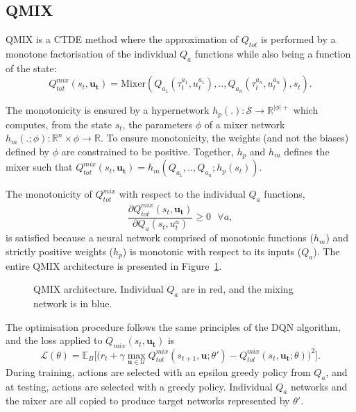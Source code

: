 \subsection{QMIX}
QMIX \citep{Rashid2018} is a CTDE method where the approximation of $Q_{tot}$ is performed by a monotone factorisation of the individual $Q_a$ functions while also being a function of the state:
\begin{equation}
     Q_{tot}^{mix}(s_t, \mathbf{u_t})=\text{Mixer} \left(Q_{a_1}(\tau^{a_1}_t, u_t^{a_1}) ,..,Q_{a_n}(\tau^{a_n}_t, u_t^{a_n}), s_t\right).
     \label{eq:ch3_qmixappendix}
\end{equation}

The monotonicity is ensured by a hypernetwork \citep{Ha2016HyperNetworks} $h_p(.): \mathcal{S} \rightarrow \mathbb{R}^{|\phi|+}$ which computes, from the state $s_t$, the parameters $\phi$ of a mixer network $h_m(.;\phi):\mathbb{R}^n \times \phi \rightarrow \mathbb{R}$.
To ensure monotonicity, the weights (and not the biases) defined by $\phi$ are constrained to be positive.
Together, $h_p$ and $h_m$ defines the mixer such that $ Q_{tot}^{mix}(s_t, \mathbf{u_t}) = h_m\left(Q_{a_1},..,Q_{a_n}; h_p(s_t)\right)$.

The monotonicity of $Q_{tot}^{mix}$ with respect to the individual $Q_a$ functions, 
\begin{equation}
    \frac{\partial Q_{tot}^{mix}(s_t, \mathbf{u_t})}{\partial Q_{a}(s_t, u_t^{a})} \geq 0 \text{ } \forall a
    \label{eq:ch3_monotonicity},
\end{equation}
is satisfied because a neural network comprised of monotonic functions ($h_m$) and strictly positive weights ($h_p$) is monotonic with respect to its inputs ($Q_a$). 
The entire QMIX architecture is presented in Figure~\ref{fig:qmix}.

\begin{figure}
\centering

\caption{QMIX architecture. Individual $Q_a$ are in red, and the mixing network is in blue.}
\label{fig:qmix}
\end{figure}

The optimisation procedure follows the same principles of the DQN algorithm, and the loss applied to $Q_{mix}(s_t, \mathbf{u_t})$ is 
\begin{equation}
    \mathcal{L}(\theta) = \mathbb{E}_{B}
    \bigg[  
    \big(r_{t} + \gamma \max_{\mathbf{u} \in \mathcal{U}} Q_{tot}^{mix}(s_{t+1}, \mathbf{u}; \theta')
    - Q_{tot}^{mix}(s_{t}, \mathbf{u_{t}}; \theta)\big)^{2}
    \bigg].
    \label{eq:QMIX_loss}
\end{equation}
During training, actions are selected with an epsilon greedy policy from $Q_a$, and at testing, actions are selected with a greedy policy.
Individual $Q_a$ networks and the mixer are all copied to produce target networks represented by $\theta'$.

